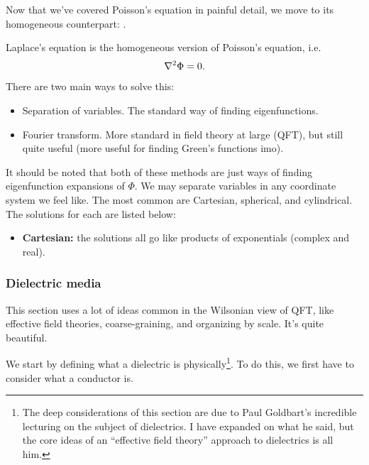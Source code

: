 \documentclass[11pt]{article}
\begin{document}
Now that we've covered Poisson's equation in painful
detail, we move to its homogeneous counterpart: .

\begin{iidea}
    Laplace's equation is the homogeneous version of Poisson's
    equation, i.e.
    \begin{align*}
        \nabla^2 \Phi = 0.
    \end{align*}
    There are two main ways to solve this:
    \begin{itemize}
        \item Separation of variables. The standard way of finding eigenfunctions.
        \item Fourier transform. More standard in field
        theory at large (QFT), but still quite useful
        (more useful for finding Green's functions imo).
    \end{itemize}
    It should be noted that both of these methods are just ways of
    finding eigenfunction expansions of $\Phi$. We may separate variables in 
    any coordinate system we feel like. The most common are Cartesian, spherical, 
    and cylindrical. The solutions for each are listed below:
    \begin{itemize}
        \item \textbf{Cartesian:} the solutions all go like products
        of exponentials (complex and real). 
    \end{itemize}
\end{iidea}

\begin{iidea}
\end{iidea}

\subsubsection{Dielectric media}

\begin{reemark}
    This section uses a lot of ideas common in the Wilsonian
    view of QFT, like effective field theories, coarse-graining,
    and organizing by scale. It's quite beautiful.
\end{reemark}

We start by defining what a dielectric is physically\footnote{The
deep considerations of this section are due to Paul Goldbart's
incredible lecturing on the subject of dielectrics. I have expanded
on what he said, but the core ideas of an ``effective field theory''
approach to dielectrics is all him.}. To do this, we first have
to consider what a conductor is.
\end{document}
